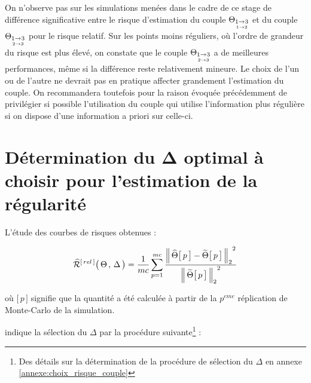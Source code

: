 
On n'observe pas sur les simulations menées dans le cadre de ce stage de différence significative entre le risque d'estimation du couple $\thetaA$ et du couple $\thetaB$ pour le risque relatif. Sur les points moins réguliers, où l'ordre de grandeur du risque est plus élevé, on constate que le couple $\thetaB$ a de meilleures performances, même si la différence reste relativement mineure. Le choix de l'un ou de l'autre ne devrait pas en pratique affecter grandement l'estimation du couple. On recommandera toutefois pour la raison évoquée précédemment de privilégier si possible l'utilisation du couple qui utilise l'information plus régulière si on dispose d'une information a priori sur celle-ci.

\section{Détermination du Δ optimal à choisir pour l'estimation de la régularité}
\label{sec:determination-delta}

\noindent L'étude des courbes de risques obtenues :

\begin{equation}
	\widehat{\mathcal R}^{[\,rel\,]} \bigl( \, \Theta \, , \, \Delta \, \bigr)
	= 
	\frac 1 {mc} \sum\limits_{p=1}^{mc} \frac{{\distnorme 2 {\widehat \Theta\bigl[\, p \,\bigr]} {\widetilde \Theta \bigl[ \,p \,\bigr]}}^2}{{\norme 2 {\widetilde \Theta \bigl[ \,p \,\bigr]}}^2}
\end{equation}

\smallskip
\noindent où $\bigl[\, p \,\bigr]$ signifie que la quantité a été calculée à partir de la $p^{eme}$ réplication de Monte-Carlo de la simulation.

\bigskip

\noindent indique la sélection du $\Delta$ par la procédure suivante\footnote{Des détails sur la détermination de la procédure de sélection du $\Delta$ en annexe \ref{annexe:choix_risque_couple}} :

